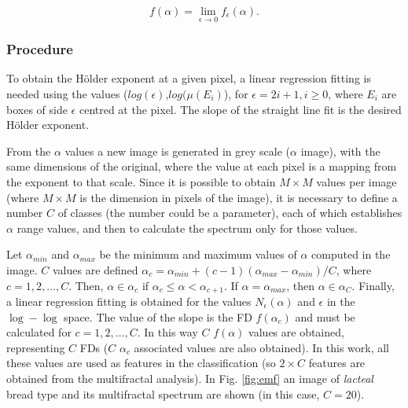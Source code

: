 \documentclass[oneside,a4paper,english,links]{amca}
\begin{document}
\begin{equation}
f(\alpha) = \lim_{\epsilon\to0}{f_{\epsilon}(\alpha)}.
\label{eqn:eqn7}
\end{equation}

\subsubsection{Procedure}
To obtain the H\"older exponent at a given pixel, a linear regression fitting is needed using the values ($log(\epsilon)$,$log(\mu(E_{i})$), for $\epsilon = 2i + 1, i \ge 0$, where $E_{i}$ are boxes of side $\epsilon$ centred at the pixel. The slope of the straight line fit is the desired H\"older exponent.

From the $\alpha$ values a new image is generated in grey scale ($\alpha$ image), with the same dimensions of the original, where the value at each pixel is a mapping from the exponent to that scale. Since it is possible to obtain $M\times M$ values per image (where $M\times M$ is the dimension in pixels of the image), it is necessary to define a number $C$ of classes (the number could be a parameter), each of which establishes $\alpha$ range values, and then to calculate the spectrum only for those values.

Let $\alpha_{min}$ and  $\alpha_{max}$ be the minimum and maximum values of $\alpha$ computed in the image. $C$ values are defined $\alpha_{c} = \alpha_{min} + (c-1)(\alpha_{max}-\alpha_{min})/C$, where $c = 1,2,\dots,C$. Then, $\alpha \in \alpha_{c}$ if $\alpha_{c} \leq \alpha < \alpha_{c+1}$. If $\alpha = \alpha_{max}$, then $\alpha \in \alpha_{C}$. Finally, a linear regression fitting is obtained for the values $N_{\epsilon}(\alpha)$ and $\epsilon$ in the $\log-\log$ space. The value of the slope is the FD $f(\alpha_{c})$ and must be calculated for $c = 1,2,\dots,C$. In this way $C$ $f(\alpha)$ values are obtained, representing $C$ FDs ($C$ $\alpha_{c}$ associated values are also obtained). In this work, all these values are used as features in the classification (so $2\times C$ features are obtained from the multifractal analysis). In Fig. \ref{fig:emf} an image of {\em lacteal} bread type and its multifractal spectrum are shown (in this case, $C = 20$).
\end{document}
